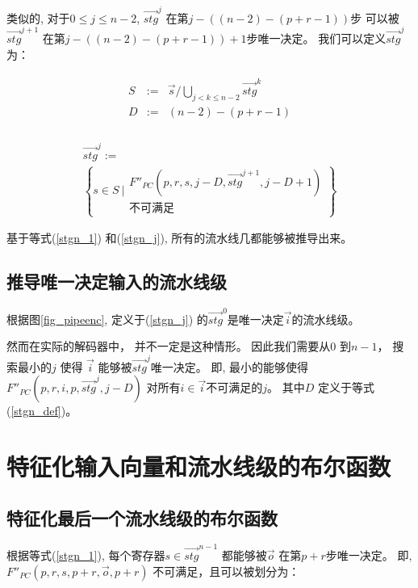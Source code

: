 类似的,
对于$0\le j\le n-2$,
$\vec{stg}^j$ 在第$j-((n-2)-(p+r-1))$步
可以被$\vec{stg}^{j+1}$ 在第$j-((n-2)-(p+r-1))+1$步唯一决定。
我们可以定义$\vec{stg}^j$ 为：

\begin{multline}\label{stgn_def}
\begin{array}{ccc}
S             & := & \vec{s}/\bigcup_{j<k\le n-2}\vec{stg}^{k}\\
D             & := & (n-2)-(p+r-1)\\
\end{array}
\end{multline}

\begin{multline}\label{stgn_j}
\vec{stg}^{j} := \\
 \left\{
 s\in S ~|
\begin{array}{cc}
 F''_{PC}(p,r,s,j-D,\vec{stg}^{j+1},j-D+1)\\
不可满足
\end{array}
\right\}
\end{multline}

基于等式(\ref{stgn_1}) 和(\ref{stgn_j}),
所有的流水线几都能够被推导出来。

\subsection{推导唯一决定输入的流水线级}\label{subsec_inferinput}

根据图\ref{fig_pipeenc},
 定义于(\ref{stgn_j}) 的$\vec{stg}^0$是唯一决定$\vec{i}$的流水线级。

然而在实际的解码器中，
并不一定是这种情形。
因此我们需要从$0$ 到$n-1$，
搜索最小的$j$ 使得
$\vec{i}$ 能够被$\vec{stg}^j$唯一决定。
即,
最小的能够使得$F''_{PC}(p,r,i,p,\vec{stg}^{j},j-D)$ 对所有$i\in \vec{i}$不可满足的$j$。
其中$D$ 定义于等式(\ref{stgn_def})。

\section{特征化输入向量和流水线级的布尔函数}\label{sec_char}
\subsection{特征化最后一个流水线级的布尔函数}

根据等式(\ref{stgn_1}),
每个寄存器$s\in \vec{stg}^{n-1}$ 都能够被$\vec{o}$ 在第$p+r$步唯一决定。
即,
$F''_{PC}(p,r,s,p+r,\vec{o},p+r)$ 不可满足，且可以被划分为：

